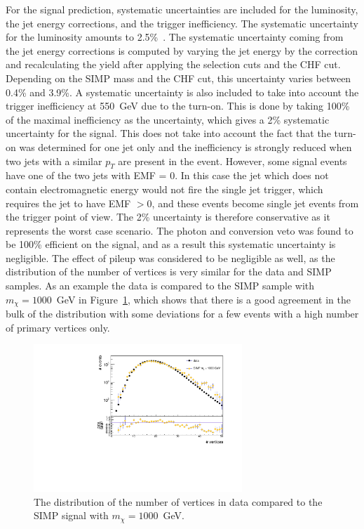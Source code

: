 For the signal prediction, systematic uncertainties are included for the luminosity, the jet energy corrections, and the trigger inefficiency. The systematic uncertainty for the luminosity amounts to 2.5\%~\cite{Kornmayer:2039978}. The systematic uncertainty coming from the jet energy corrections is computed by varying the jet energy by the correction and recalculating the yield after applying the selection cuts and the CHF cut. Depending on the \ac{SIMP} mass and the CHF cut, this uncertainty varies between 0.4\% and 3.9\%. A systematic uncertainty is also included to take into account the trigger inefficiency at \SI{550}{GeV} due to the turn-on. This is done by taking 100\% of the maximal inefficiency as the uncertainty, which gives a 2\% systematic uncertainty for the signal. This does not take into account the fact that the turn-on was determined for one jet only and the inefficiency is strongly reduced when two jets with a similar $p_T$ are present in the event. However, some signal events have one of the two jets with EMF = 0. In this case the jet which does not contain electromagnetic energy would not fire the single jet trigger, which requires the jet to have EMF $> 0$, and these events become single jet events from the trigger point of view. The 2\% uncertainty is therefore conservative as it represents the worst case scenario. The photon and conversion veto was found to be 100\% efficient on the signal, and as a result this systematic uncertainty is negligible. The effect of pileup was considered to be negligible as well, as the distribution of the number of vertices is very similar for the data and \ac{SIMP} samples. As an example the data is compared to the \ac{SIMP} sample with $m_{\chi} = 1000$~GeV in Figure~\ref{fig:PU}, which shows that there is a good agreement in the bulk of the distribution with some deviations for a few events with a high number of primary vertices only.

\begin{figure}[ht]
  \centering
  \includegraphics[width=0.7\textwidth]{figures/PU_reweighting_SIMP_M-1000.pdf}\hfill%
  \caption{The distribution of the number of vertices in data compared to the \ac{SIMP} signal with $m_{\chi} = 1000$~GeV.}
  \label{fig:PU}
\end{figure}

